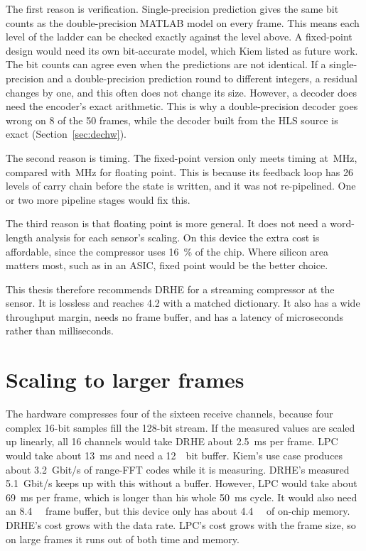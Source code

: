 The first reason is verification. Single-precision prediction gives the same
bit counts as the double-precision MATLAB model on every frame. This means each
level of the ladder can be checked exactly against the level above. A
fixed-point design would need its own bit-accurate model, which Kiem listed as
future work. The bit counts can agree even when the predictions are not
identical. If a single-precision and a double-precision prediction round to
different integers, a residual changes by one, and this often does not change
its size. However, a decoder does need the encoder's exact arithmetic. This is
why a double-precision decoder goes wrong on 8 of the 50 frames, while the
decoder built from the HLS source is exact (Section~\ref{sec:dechw}).

The second reason is timing. The fixed-point version only meets timing at
\,MHz, compared with \,MHz for floating point.
This is because its feedback loop has 26 levels of carry chain before the state
is written, and it was not re-pipelined. One or two more pipeline stages would
fix this.

The third reason is that floating point is more general. It does not need a
word-length analysis for each sensor's scaling. On this device the extra cost
is affordable, since the compressor uses \SI{16}{\percent} of the chip. Where
silicon area matters most, such as in an ASIC, fixed point would be the better
choice.

This thesis therefore recommends DRHE for a streaming compressor at the sensor.
It is lossless and reaches \num{4.2} with a matched dictionary. It also has a
wide throughput margin, needs no frame buffer, and has a latency of
microseconds rather than milliseconds.

\section{Scaling to larger frames}
\label{sec:scaling}

The hardware compresses four of the sixteen receive channels, because four
complex 16-bit samples fill the 128-bit stream. If the measured values are
scaled up linearly, all 16 channels would take DRHE about
\SI{2.5}{\milli\second} per frame. LPC would take about
\SI{13}{\milli\second} and need a \SI{12}{\mebi bit} buffer. Kiem's use case
produces about \SI{3.2}{Gbit/s} of range-FFT codes while it is measuring.
DRHE's measured \SI{5.1}{Gbit/s} keeps up with this without a buffer. However,
LPC would take about \SI{69}{\milli\second} per frame, which is longer than
his whole \SI{50}{\milli\second} cycle. It would also need an
\SI{8.4}{\mega\byte} frame buffer, but this device only has about
\SI{4.4}{\mega\byte} of on-chip memory. DRHE's cost grows with the data rate.
LPC's cost grows with the frame size, so on large frames it runs out of both
time and memory.

